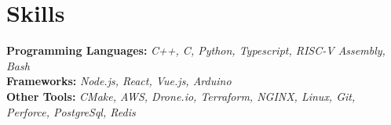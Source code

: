 \documentclass[letterpaper,12pt]{article} %
\begin{document}
\vspace{-10pt} %

\section{Skills}
\begin{itemize}[leftmargin=0.15in, label={}]
  \small{\item{
        \textbf{Programming Languages: }{\emph{C++, C, Python, Typescript, RISC-V Assembly, Bash}} \\
        \textbf{Frameworks: }{\emph{Node.js, React, Vue.js, Arduino}}\\
        \textbf{Other Tools: }{\emph{CMake, AWS, Drone.io, Terraform, NGINX, Linux, Git, Perforce, PostgreSql, Redis}} \\
        }}
\end{itemize}

\end{document}
